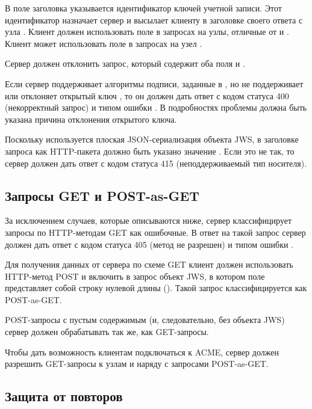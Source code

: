 В поле  заголовка указывается идентификатор ключей учетной записи.
Этот идентификатор назначает сервер и высылает клиенту в заголовке
 своего ответа с узла . Клиент должен
использовать поле  в запросах на узлы, отличные от  
и . Клиент может использовать поле  в запросах на 
узел .

Сервер должен отклонить запрос, который содержит оба поля  и 
.

Если сервер поддерживает алгоритмы подписи, заданные в , но не 
поддерживает или отклоняет открытый ключ , то он должен дать ответ с 
кодом статуса 400 (некорректный запрос) и типом ошибки . В 
подробностях проблемы должна быть указана причина отклонения открытого ключа.

Поскольку используется плоская JSON-сериализация объекта JWS, в заголовке 
 запроса как HTTP-пакета должно быть указано значение
. Если это не так, то сервер должен дать ответ с 
кодом статуса 415 (неподдерживаемый тип носителя).

\subsection{Запросы GET и POST-as-GET}\label{ACME.Transport.GET}

За исключением случаев, которые описываются ниже, сервер классифицирует 
запросы по HTTP-методам GET как ошибочные. В ответ на такой запрос сервер 
должен дать ответ с кодом статуса 405 (метод не разрешен) и типом ошибки 
.

Для получения данных от сервера по схеме GET клиент должен использовать
HTTP-метод POST и включить в запрос объект JWS, в котором поле 
представляет собой строку нулевой длины (\sstr{}). Такой запрос классифицируется
как POST-as-GET.

POST-запросы с пустым содержимым (и, следовательно, без объекта JWS) сервер 
должен обрабатывать так же, как GET-запросы.

Чтобы дать возможность клиентам подключаться к ACME, сервер должен разрешить 
GET-запросы к узлам  и  наряду с запросами 
POST-as-GET.

\subsection{Защита от повторов}\label{ACME.Transport.Reply}

